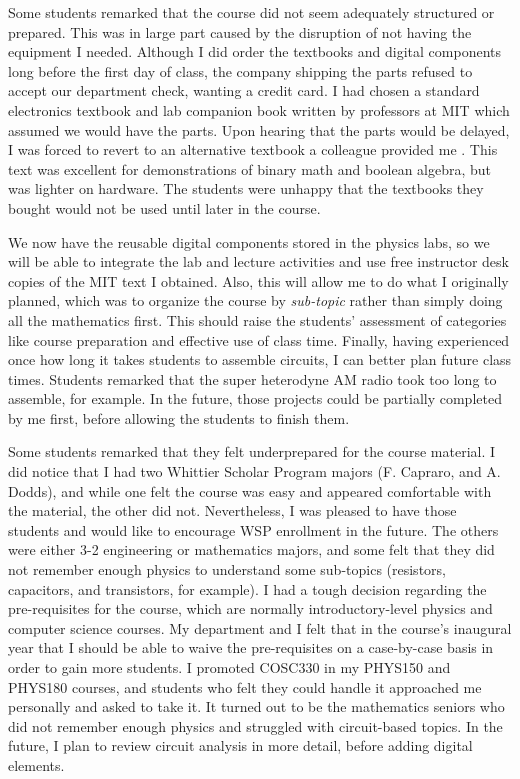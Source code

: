\documentclass[../../main.tex]{subfiles}
\begin{document}
Some students remarked that the course did not seem adequately structured or prepared.  This was in large part caused by the disruption of not having the equipment I needed.  Although I did order the textbooks and digital components long before the first day of class, the company shipping the parts refused to accept our department check, wanting a credit card.  I had chosen a standard electronics textbook and lab companion book written by professors at MIT \cite{theArtOfElectronics} which assumed we would have the parts. Upon hearing that the parts would be delayed, I was forced to revert to an alternative textbook a colleague provided me \cite{digitalFund}. This text was excellent for demonstrations of binary math and boolean algebra, but was lighter on hardware. The students were unhappy that the textbooks they bought would not be used until later in the course. \\ \hspace{0.1cm}

We now have the reusable digital components stored in the physics labs, so we will be able to integrate the lab and lecture activities and use free instructor desk copies of the MIT text I obtained.  Also, this will allow me to do what I originally planned, which was to organize the course by \textit{sub-topic} rather than simply doing all the mathematics first.  This should raise the students' assessment of categories like course preparation and effective use of class time.  Finally, having experienced once how long it takes students to assemble circuits, I can better plan future class times.  Students remarked that the super heterodyne AM radio took too long to assemble, for example.  In the future, those projects could be partially completed by me first, before allowing the students to finish them. \\ \hspace{0.1cm}

Some students remarked that they felt underprepared for the course material.  I did notice that I had two Whittier Scholar Program majors (F. Capraro, and A. Dodds), and while one felt the course was easy and appeared comfortable with the material, the other did not.  Nevertheless, I was pleased to have those students and would like to encourage WSP enrollment in the future.  The others were either 3-2 engineering or mathematics majors, and some felt that they did not remember enough physics to understand some sub-topics (resistors, capacitors, and transistors, for example).  I had a tough decision regarding the pre-requisites for the course, which are normally introductory-level physics and computer science courses.  My department and I felt that in the course's inaugural year that I should be able to waive the pre-requisites on a case-by-case basis in order to gain more students.  I promoted COSC330 in my PHYS150 and PHYS180 courses, and students who felt they could handle it approached me personally and asked to take it. It turned out to be the mathematics seniors who did not remember enough physics and struggled with circuit-based topics.  In the future, I plan to review circuit analysis in more detail, before adding digital elements. \\ \hspace{0.1cm}
\end{document}
